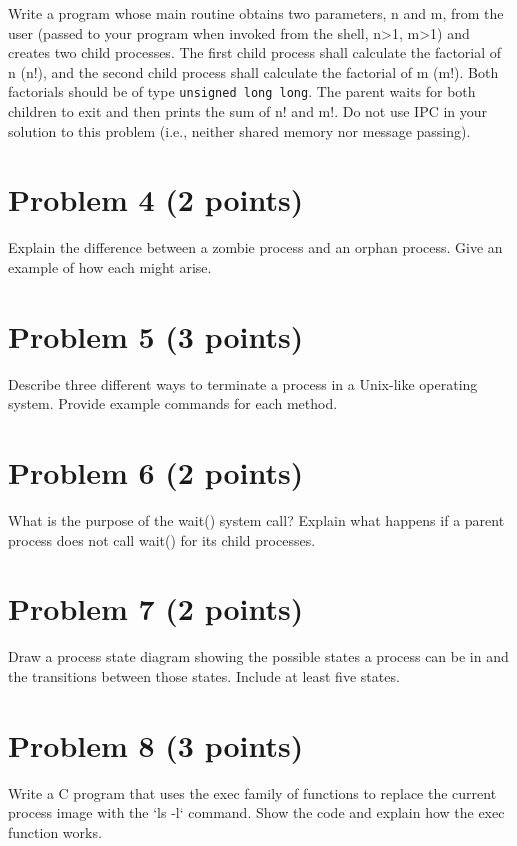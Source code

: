 \documentclass{article}
\begin{document}
Write a program whose main routine obtains two parameters, n and m, from the user (passed to your program when invoked from the shell, n>1, m>1) and creates two child processes.  The first child process shall calculate the factorial of n (n!), and the second child process shall calculate the factorial of m (m!). Both factorials should be of type \texttt{unsigned long long}. The parent waits for both children to exit and then prints the sum of n! and m!. Do not use IPC in your solution to this problem (i.e., neither shared memory nor message passing).


\section*{Problem 4 (2 points)}

Explain the difference between a zombie process and an orphan process.  Give an example of how each might arise.


\section*{Problem 5 (3 points)}

Describe three different ways to terminate a process in a Unix-like operating system.  Provide example commands for each method.


\section*{Problem 6 (2 points)}

What is the purpose of the wait() system call? Explain what happens if a parent process does not call wait() for its child processes.


\section*{Problem 7 (2 points)}

Draw a process state diagram showing the possible states a process can be in and the transitions between those states. Include at least five states.


\section*{Problem 8 (3 points)}

Write a C program that uses the exec family of functions to replace the current process image with the `ls -l` command.  Show the code and explain how the exec function works.
\end{document}
